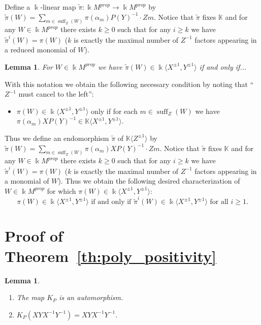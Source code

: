 \documentclass{amsart}
\newtheorem{lemma}[theorem]{Lemma}
\newcommand{\kk}{\Bbbk}
\newcommand{\KK}{\mathbb{K}}
\newcommand{\suff}{\operatorname{suff}}
\newenvironment{enumeratea}{\begin{enumerate}[\upshape (a)]}
                           {\end{enumerate}}
\begin{document}
 Define a $\kk$-linear map $\tilde\pi:\kk M^{prop}\to\kk M^{prop}$ by $\tilde\pi(W)=\sum\limits_{m\in\suff_Z(W)} \pi(\alpha_m)P(Y)^{-1}\cdot Zm$.  Notice that $\tilde\pi$ fixes $\KK$ and for any $W\in\kk M^{prop}$ there exists $k\ge0$ such that for any $i\ge k$ we have $\tilde\pi^i(W)=\pi(W)$ ($k$ is exactly the maximal number of $Z^{-1}$ factors appearing in a reduced monomial of $W$).
 \begin{lemma}
  For $W\in\kk M^{prop}$ we have $\tilde\pi(W)\in\kk\langle X^{\pm1},Y^{\pm1}\rangle$ if and only if...
 \end{lemma}

 With this notation we obtain the following necessary condition by noting that ``$Z^{-1}$ must cancel to the left'':
 \begin{itemize}
  \item $\pi(W)\in\kk\langle X^{\pm1},Y^{\pm1}\rangle$ only if for each $m\in\suff_Z(W)$ we have $\pi(\alpha_m)XP(Y)^{-1}\in\KK\langle X^{\pm1},Y^{\pm1}\rangle$.
 \end{itemize}
 Thus we define an endomorphism $\tilde\pi$ of $\KK\langle Z^{\pm1}\rangle$ by $\tilde\pi(W)=\sum\limits_{m\in\suff_Z(W)} \pi(\alpha_m)XP(Y)^{-1}\cdot Zm$.  Notice that $\tilde\pi$ fixes $\KK$ and for any $W\in\kk M^{prop}$ there exists $k\ge0$ such that for any $i\ge k$ we have $\tilde\pi^i(W)=\pi(W)$ ($k$ is exactly the maximal number of $Z^{-1}$ factors appearing in a monomial of $W$).  Thus we obtain the following desired characterization of $W\in\kk M^{prop}$ for which $\pi(W)\in\kk\langle X^{\pm1},Y^{\pm1}\rangle$:
 \begin{equation}\label{eq:Laurentness criterion}
  \text{$\pi(W)\in\kk\langle X^{\pm1},Y^{\pm1}\rangle$ if and only if $\tilde\pi^i(W)\in\kk\langle X^{\pm1},Y^{\pm1}\rangle$ for all $i\ge1$.}
 \end{equation}
 

\section{Proof of Theorem~\ref{th:poly_positivity}}
 
 \begin{lemma}\label{lem:simple_obs}\mbox{}
  \begin{enumeratea}
   \item The map $K_P$ is an automorphism.
   \item $K_P(XYX^{-1}Y^{-1})=XYX^{-1}Y^{-1}$.
  \end{enumeratea}
 \end{lemma}
\end{document}
